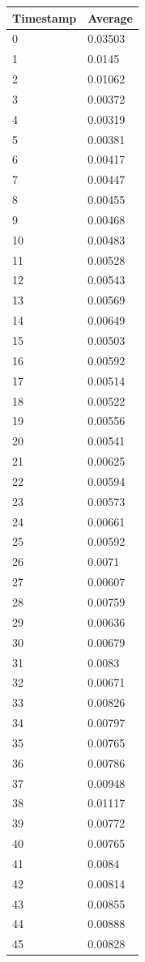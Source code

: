 %
%
\begin{tabular}{|l||l|}
\hline
	\textbf{Timestamp} & \textbf{Average} \\ \hline
	0 & 0.03503 \\ \hline
	1 & 0.0145 \\ \hline
	2 & 0.01062 \\ \hline
	3 & 0.00372 \\ \hline
	4 & 0.00319 \\ \hline
	5 & 0.00381 \\ \hline
	6 & 0.00417 \\ \hline
	7 & 0.00447 \\ \hline
	8 & 0.00455 \\ \hline
	9 & 0.00468 \\ \hline
	10 & 0.00483 \\ \hline
	11 & 0.00528 \\ \hline
	12 & 0.00543 \\ \hline
	13 & 0.00569 \\ \hline
	14 & 0.00649 \\ \hline
	15 & 0.00503 \\ \hline
	16 & 0.00592 \\ \hline
	17 & 0.00514 \\ \hline
	18 & 0.00522 \\ \hline
	19 & 0.00556 \\ \hline
	20 & 0.00541 \\ \hline
	21 & 0.00625 \\ \hline
	22 & 0.00594 \\ \hline
	23 & 0.00573 \\ \hline
	24 & 0.00661 \\ \hline
	25 & 0.00592 \\ \hline
	26 & 0.0071 \\ \hline
	27 & 0.00607 \\ \hline
	28 & 0.00759 \\ \hline
	29 & 0.00636 \\ \hline
	30 & 0.00679 \\ \hline
	31 & 0.0083 \\ \hline
	32 & 0.00671 \\ \hline
	33 & 0.00826 \\ \hline
	34 & 0.00797 \\ \hline
	35 & 0.00765 \\ \hline
	36 & 0.00786 \\ \hline
	37 & 0.00948 \\ \hline
	38 & 0.01117 \\ \hline
	39 & 0.00772 \\ \hline
	40 & 0.00765 \\ \hline
	41 & 0.0084 \\ \hline
	42 & 0.00814 \\ \hline
	43 & 0.00855 \\ \hline
	44 & 0.00888 \\ \hline
	45 & 0.00828 \\ \hline
\end{tabular}
